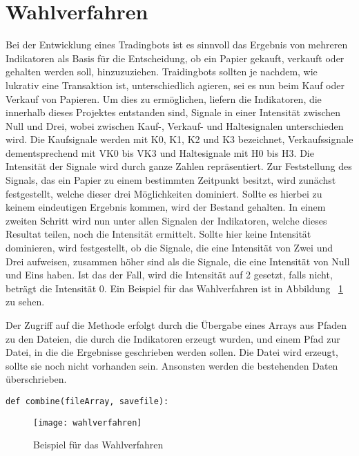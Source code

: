 

\section{Wahlverfahren}

Bei der Entwicklung eines Tradingbots ist es sinnvoll das Ergebnis von mehreren Indikatoren als Basis für die Entscheidung, ob ein Papier gekauft, verkauft oder gehalten werden soll, hinzuzuziehen. Traidingbots sollten je nachdem, wie lukrativ eine Transaktion ist, unterschiedlich agieren, sei es nun beim Kauf oder Verkauf von Papieren. Um dies zu ermöglichen, liefern die Indikatoren, die innerhalb dieses Projektes entstanden sind, Signale in einer Intensität zwischen Null und Drei, wobei zwischen Kauf-, Verkauf- und Haltesignalen unterschieden wird. Die Kaufsignale werden mit K0, K1, K2 und K3 bezeichnet, Verkaufssignale dementsprechend mit VK0 bis VK3 und Haltesignale mit H0 bis H3. Die Intensität der Signale wird durch ganze Zahlen repräsentiert. Zur Feststellung des Signals, das ein Papier zu einem bestimmten Zeitpunkt besitzt, wird zunächst festgestellt, welche dieser drei Möglichkeiten dominiert. Sollte es hierbei zu keinem eindeutigen Ergebnis kommen, wird der Bestand gehalten. In einem zweiten 
Schritt wird nun unter allen Signalen der Indikatoren, welche dieses Resultat teilen, noch die Intensität ermittelt. Sollte hier keine Intensität dominieren, wird festgestellt, ob die Signale, die eine Intensität von Zwei und Drei aufweisen, zusammen höher sind als die Signale, die eine Intensität von Null und Eins haben. Ist das der Fall, wird die Intensität auf 2 gesetzt, falls nicht, beträgt die Intensität 0. Ein Beispiel für das Wahlverfahren ist in Abbildung ~\ref{exampleElection} zu sehen.

Der Zugriff auf die Methode erfolgt durch die Übergabe eines Arrays aus Pfaden zu den Dateien, die durch die Indikatoren erzeugt wurden, und einem Pfad zur Datei, in die die Ergebnisse geschrieben werden sollen. Die Datei wird erzeugt, sollte sie noch nicht vorhanden sein. Ansonsten werden die bestehenden Daten überschrieben.
\begin{lstlisting}[breakatwhitespace=false, breaklines=true]
def combine(fileArray, savefile):
\end{lstlisting}
\begin{figure}[!ht]
  \centering
  \texttt{[image: wahlverfahren]}
  \caption{Beispiel für das Wahlverfahren}
  \label{exampleElection}
\end{figure}

